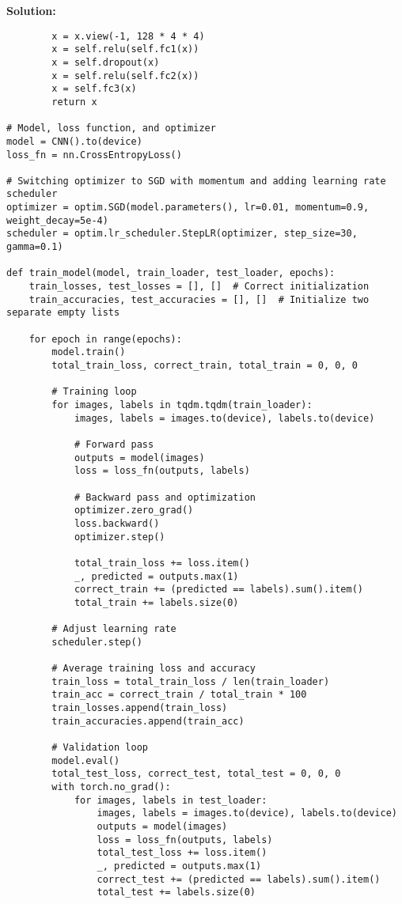 \documentclass{article}
\newenvironment{solution}{\color{blue} \smallskip \textbf{Solution:}}{}
\begin{document}
\begin{solution}
\begin{verbatim}
        x = x.view(-1, 128 * 4 * 4)
        x = self.relu(self.fc1(x))
        x = self.dropout(x)
        x = self.relu(self.fc2(x))
        x = self.fc3(x)
        return x

# Model, loss function, and optimizer
model = CNN().to(device)
loss_fn = nn.CrossEntropyLoss()

# Switching optimizer to SGD with momentum and adding learning rate scheduler
optimizer = optim.SGD(model.parameters(), lr=0.01, momentum=0.9, weight_decay=5e-4)
scheduler = optim.lr_scheduler.StepLR(optimizer, step_size=30, gamma=0.1)

def train_model(model, train_loader, test_loader, epochs):
    train_losses, test_losses = [], []  # Correct initialization
    train_accuracies, test_accuracies = [], []  # Initialize two separate empty lists

    for epoch in range(epochs):
        model.train()
        total_train_loss, correct_train, total_train = 0, 0, 0

        # Training loop
        for images, labels in tqdm.tqdm(train_loader):
            images, labels = images.to(device), labels.to(device)

            # Forward pass
            outputs = model(images)
            loss = loss_fn(outputs, labels)

            # Backward pass and optimization
            optimizer.zero_grad()
            loss.backward()
            optimizer.step()

            total_train_loss += loss.item()
            _, predicted = outputs.max(1)
            correct_train += (predicted == labels).sum().item()
            total_train += labels.size(0)

        # Adjust learning rate
        scheduler.step()

        # Average training loss and accuracy
        train_loss = total_train_loss / len(train_loader)
        train_acc = correct_train / total_train * 100
        train_losses.append(train_loss)
        train_accuracies.append(train_acc)

        # Validation loop
        model.eval()
        total_test_loss, correct_test, total_test = 0, 0, 0
        with torch.no_grad():
            for images, labels in test_loader:
                images, labels = images.to(device), labels.to(device)
                outputs = model(images)
                loss = loss_fn(outputs, labels)
                total_test_loss += loss.item()
                _, predicted = outputs.max(1)
                correct_test += (predicted == labels).sum().item()
                total_test += labels.size(0)


\end{verbatim}
\end{solution}
\end{document}
